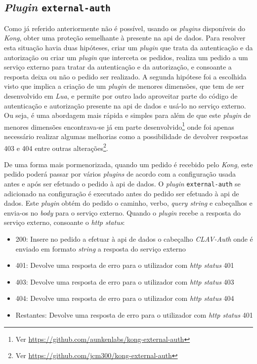 \subsection{\textit{Plugin} \texttt{external-auth}}
Como já referido anteriormente não é possível, usando os \textit{plugins} disponíveis do \textit{Kong}, obter uma proteção semelhante à presente na \acrshort{api} de dados. Para resolver esta situação havia duas hipóteses, criar um \textit{plugin} que trata da autenticação e da autorização ou criar um \textit{plugin} que interceta os pedidos, realiza um pedido a um serviço externo para tratar da autenticação e da autorização, e consoante a resposta deixa ou não o pedido ser realizado. A segunda hipótese foi a escolhida visto que implica a criação de um \textit{plugin} de menores dimensões, que tem de ser desenvolvido em \textit{Lua}, e permite por outro lado aproveitar parte do código de autenticação e autorização presente na \acrshort{api} de dados e usá-lo no serviço externo. Ou seja, é uma abordagem mais rápida e simples para além de que este \textit{plugin} de menores dimensões encontrava-se já em parte desenvolvido\footnote{Ver \url{https://github.com/aunkenlabs/kong-external-auth}} onde foi apenas necessário realizar algumas melhorias como a possibilidade de devolver respostas 403 e 404 entre outras alterações\footnote{Ver \url{https://github.com/jcm300/kong-external-auth}}.

De uma forma mais pormenorizada, quando um pedido é recebido pelo \textit{Kong}, este pedido poderá passar por vários \textit{plugins} de acordo com a configuração usada antes e após ser efetuado o pedido à \acrshort{api} de dados. O \textit{plugin} \texttt{external-auth} se adicionado na configuração é executado antes do pedido ser efetuado à \acrshort{api} de dados. Este \textit{plugin} obtém do pedido o caminho, verbo, \textit{query string} e cabeçalhos e envia-os no \textit{body} para o serviço externo. Quando o \textit{plugin} recebe a resposta do serviço externo, consoante o \textit{\acrshort{http} status}:
\begin{itemize}
    \item 200: Insere no pedido a efetuar à \acrshort{api} de dados o cabeçalho \textit{CLAV-Auth} onde é enviado em formato \textit{string} a resposta do serviço externo
    \item 401: Devolve uma resposta de erro para o utilizador com \textit{\acrshort{http} status} 401
    \item 403: Devolve uma resposta de erro para o utilizador com \textit{\acrshort{http} status} 403
    \item 404: Devolve uma resposta de erro para o utilizador com \textit{\acrshort{http} status} 404
    \item Restantes: Devolve uma resposta de erro para o utilizador com \textit{\acrshort{http} status} 401

\end{itemize}


